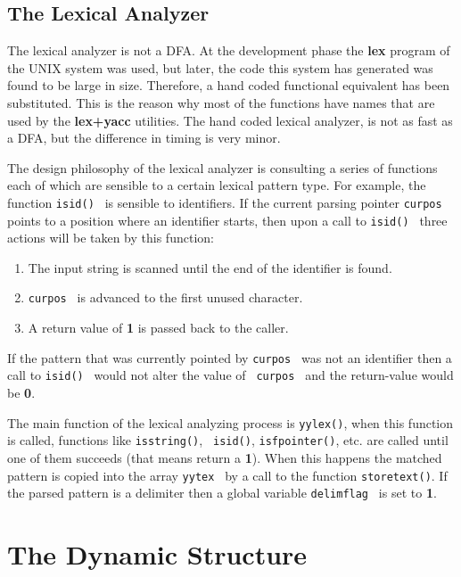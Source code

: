 \section{The Lexical Analyzer}
The  lexical  analyzer is not a DFA. At the development phase the {\bf lex}
program of the UNIX system was used, but later, the code  this  system  has
generated was found to be large in size. Therefore, a hand coded functional
equivalent  has  been  substituted.  This  is  the  reason  why most of the
functions have names that are used by the  {\bf  lex+yacc}  utilities.  The
hand coded lexical analyzer, is not as fast as a DFA, but the difference in
timing is very minor.

The  design  philosophy  of  the lexical analyzer is consulting a series of
functions each of which are sensible to a certain lexical pattern type. For
example, the function {\tt isid() } is  sensible  to  identifiers.  If  the
current  parsing  pointer  {\tt  curpos  }  points  to  a position where an
identifier starts, then upon a call to {\tt isid() } three actions will  be
taken by this function:
\begin{enumerate}
   \item     The input string is scanned until the end of the identifier is
             found.
   \item     {\tt curpos } is advanced to the first unused character.
   \item     A return value of { \bf 1 } is passed back to the caller.
\end{enumerate}
If  the  pattern  that  was  currently  pointed by {\tt curpos } was not an
identifier then a call to {\tt isid() } would not alter the value  of  {\tt
curpos } and the return-value would be {\bf 0}.

The  main  function of the lexical analyzing process is {\tt yylex()}, when
this function is called, functions like  \mbox{\tt  isstring()},  \mbox{\tt
isid()},  \mbox{\tt  isfpointer()},  etc.  are  called  until  one  of them
succeeds (that means return a {\bf  1}).  When  this  happens  the  matched
pattern  is  copied  into  the array {\tt yytex } by a call to the function
\mbox{\tt storetext()}. If the parsed pattern is a delimiter then a  global
variable {\tt delimflag } is set to {\bf 1}.


\chapter{The Dynamic Structure}
